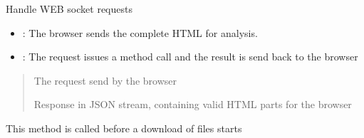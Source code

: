 \documentclass[letterpaper,10pt,english]{sphinxmanual}
\begin{document}
\begin{savenotes}
\begin{fulllineitems}
\begin{savenotes}\begin{fulllineitems}
\label{\detokenize{eezz:eezz.http_agent.THttpAgent.handle_request}}
\pysigstartsignatures
{}
\pysigstopsignatures
\sphinxAtStartPar
Handle WEB socket requests
\begin{itemize}
\item {} 
\sphinxAtStartPar
{}: The browser sends the complete HTML for analysis.

\item {} 
\sphinxAtStartPar
{}: The request issues a method call and the result is send back to the browser

\end{itemize}
\begin{quote}\begin{description}
\sphinxAtStartPar
{} \textendash{} The request send by the browser

\sphinxAtStartPar
Response in JSON stream, containing valid HTML parts for the browser

\end{description}\end{quote}

\end{fulllineitems}\end{savenotes}


\begin{savenotes}\begin{fulllineitems}
\label{\detokenize{eezz:eezz.http_agent.THttpAgent.setup_download}}
\pysigstartsignatures
{}
\pysigstopsignatures
\sphinxAtStartPar
This method is called before a download of files starts

\end{fulllineitems}\end{savenotes}


\end{fulllineitems}\end{savenotes}
\end{document}

